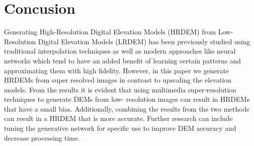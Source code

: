 \documentclass[conference]{IEEEtran}
\begin{document}
\section{Concusion}
Generating High-Resolution Digital Elevation Models
(HRDEM) from Low-Resolution Digital Elevation Models
(LRDEM) has been previously studied using traditional
interpolation techniques as well as modern approaches like
neural networks which tend to have an added benefit of
learning certain patterns and approximating them with high
fidelity. However, in this paper we generate HRDEMs from
super resolved images in contrast to upscaling the elevation
models. From the results it is evident that using multimedia
super-resolution techniques to generate DEMs from low-
resolution images can result in HRDEMs that have a small
bias. Additionally, combining the results from the two
methods can result in a HRDEM that is more accurate.
Further research can include tuning the generative network
for specific use to improve DEM accuracy and decrease
processing time.


\end{document}
